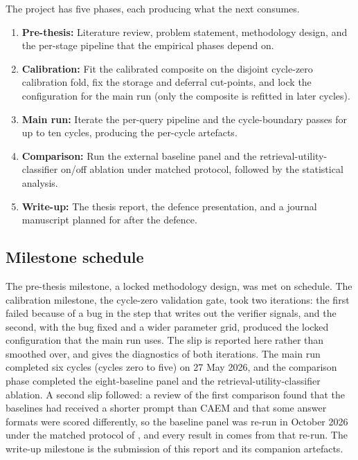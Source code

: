 The project has five phases, each producing what the next consumes.
\begin{enumerate}
    \item \textbf{Pre-thesis:} Literature review, problem statement, methodology design, and the per-stage pipeline that the empirical phases depend on.
    \item \textbf{Calibration:} Fit the calibrated composite on the disjoint cycle-zero calibration fold, fix the storage and deferral cut-points, and lock the configuration for the main run (only the composite is refitted in later cycles).
    \item \textbf{Main run:} Iterate the per-query pipeline and the cycle-boundary passes for up to ten cycles, producing the per-cycle artefacts.
    \item \textbf{Comparison:} Run the external baseline panel and the retrieval-utility-classifier on/off ablation under matched protocol, followed by the statistical analysis.
    \item \textbf{Write-up:} The thesis report, the defence presentation, and a journal manuscript planned for after the defence.
\end{enumerate}

\subsection{Milestone schedule}
\label{sec:pm-milestones}

The pre-thesis milestone, a locked methodology design, was met on schedule. The calibration milestone, the cycle-zero validation gate, took two iterations: the first failed because of a bug in the step that writes out the verifier signals, and the second, with the bug fixed and a wider parameter grid, produced the locked configuration that the main run uses. The slip is reported here rather than smoothed over, and  gives the diagnostics of both iterations. The main run completed six cycles (cycles zero to five) on 27 May 2026, and the comparison phase completed the eight-baseline panel and the retrieval-utility-classifier ablation. A second slip followed: a review of the first comparison found that the baselines had received a shorter prompt than CAEM and that some answer formats were scored differently, so the baseline panel was re-run in October 2026 under the matched protocol of , and every result in  comes from that re-run. The write-up milestone is the submission of this report and its companion artefacts.

